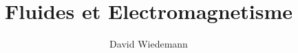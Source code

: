 

\title{Fluides et Electromagnetisme}
\author{David Wiedemann}
\date{}

\maketitle























